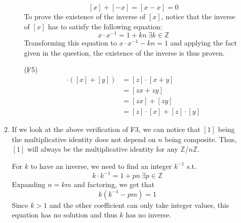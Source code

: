 \documentclass[12pt]{article}
\begin{document}
\begin{enumerate}
\begin{enumerate}
\begin{itemize}
                            \[[x]+[-x]=[x-x]=0\]
                            To prove the existence of the inverse of $[x]$, notice that the inverse of $[x]$ has
                            to satisfy the following equation:
                            \[x \cdot x^{-1}=1+kn\ \exists k \in \mathbb{Z}\]
                            Transforming this equation to $x \cdot x^{-1}-kn=1$ and applying the fact given in the
                            question, the existence of the inverse is thus proven.
                        \item[(F5)] \begin{align*}
                                [z]
                                \cdot ([x]+[y]) & = [z] \cdot [x+y]               \\
                                                & = [zx+zy]                       \\
                                                & = [zx]+[zy]                     \\
                                                & = [z] \cdot [x] + [z] \cdot [y]
                            \end{align*}
                    \end{itemize}
              \item If we look at the above verification of F3, we can notice that
                    $[1]$ being the multiplicative identity does not depend on $n$ being composite.
                    Thus, $[1]$ will always be the multiplicative identity for any $\mathbb{Z}/n\mathbb{Z}$.

                    For $k$ to have an inverse, we need to find an integer $k^{-1}$ s.t.
                    \[k \cdot k^{-1}=1+pn\ \exists p \in \mathbb{Z}\]
                    Expanding $n=km$ and factoring, we get that
                    \[k(k^{-1}-pm)=1\]
                    Since $k>1$ and the other coefficient can only take integer values,
                    this equation has no solution and thus $k$ has no inverse.
          \end{enumerate}
\end{enumerate}
\end{document}

